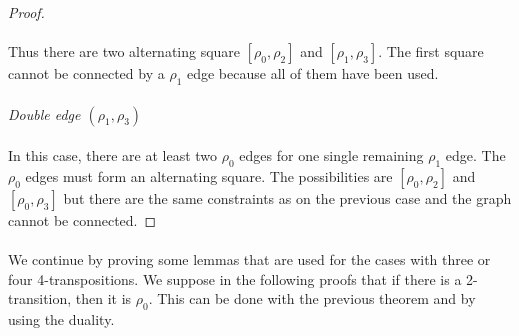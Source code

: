 \begin{proof}
\begin{figure}[H]
\begin{center}
      \caption{}
    \end{center}
  \end{figure}

  \paragraph{}
  Thus there are two alternating square $[\rho_0, \rho_2]$ and $[\rho_1, \rho_3]$. The first square cannot be connected by a $\rho_1$ edge because all of them have been used.

  \paragraph{}
  \textit{Double edge $(\rho_1, \rho_3)$}

  \paragraph{}
  In this case, there are at least two $\rho_0$ edges for one single remaining $\rho_1$ edge. The $\rho_0$ edges must form an alternating square. The possibilities are $[\rho_0, \rho_2]$ and $[\rho_0, \rho_3]$ but there are the same constraints as on the previous case and the graph cannot be connected.

\end{proof}

\paragraph{}
We continue by proving some lemmas that are used for the cases with three or four 4-transpositions. We suppose in the following proofs that if there is a 2-transition, then it is $\rho_0$. This can be done with the previous theorem and by using the duality.

